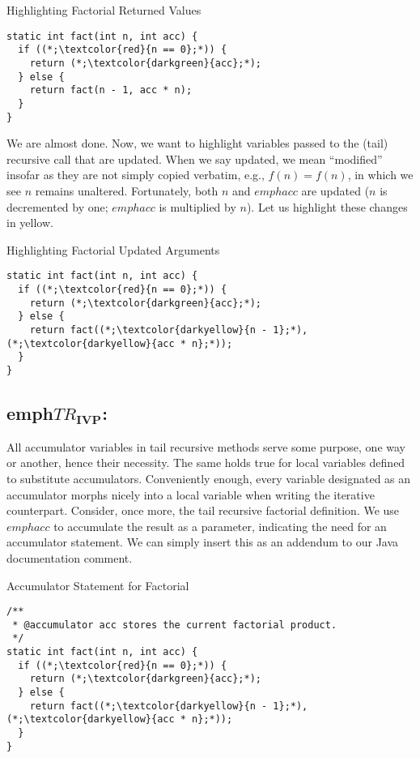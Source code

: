 \begin{cl}[]{Highlighting Factorial Returned Values}
\begin{lstlisting}[language=MyJava]
static int fact(int n, int acc) {
  if ((*;\textcolor{red}{n == 0};*)) {
    return (*;\textcolor{darkgreen}{acc};*);
  } else {
    return fact(n - 1, acc * n);
  }
}
\end{lstlisting}
\end{cl}

We are almost done. Now, we want to highlight variables passed to the (tail) recursive call that are updated. When we say updated, we mean ``modified'' insofar as they are not simply copied verbatim, e.g., $f(n) = f(n)$, in which we see $n$ remains unaltered. Fortunately, both $n$ and $emph{acc}$ are updated ($n$ is decremented by one; $emph{acc}$ is multiplied by $n$). Let us highlight these changes in \textcolor{darkyellow}{yellow}. 

\begin{cl}[]{Highlighting Factorial Updated Arguments}
\begin{lstlisting}[language=MyJava]
static int fact(int n, int acc) {
  if ((*;\textcolor{red}{n == 0};*)) {
    return (*;\textcolor{darkgreen}{acc};*);
  } else {
    return fact((*;\textcolor{darkyellow}{n - 1};*), (*;\textcolor{darkyellow}{acc * n};*));
  }
}
\end{lstlisting}
\end{cl}

\subsection{emph{$TR_\mathbf{IVP}$}:} All accumulator variables in tail recursive methods serve some purpose, one way or another, hence their necessity. The same holds true for local variables defined to substitute accumulators. Conveniently enough, every variable designated as an accumulator morphs nicely into a local variable when writing the iterative counterpart. Consider, once more, the tail recursive factorial definition. We use $emph{acc}$ to accumulate the result as a parameter, indicating the need for an accumulator statement. We can simply insert this as an addendum to our Java documentation comment.

\begin{cl}[]{Accumulator Statement for Factorial}
\begin{lstlisting}[language=MyJava]
/**
 * @accumulator acc stores the current factorial product. 
 */
static int fact(int n, int acc) {
  if ((*;\textcolor{red}{n == 0};*)) {
    return (*;\textcolor{darkgreen}{acc};*);
  } else {
    return fact((*;\textcolor{darkyellow}{n - 1};*), (*;\textcolor{darkyellow}{acc * n};*));
  }
}
\end{lstlisting}
\end{cl}

